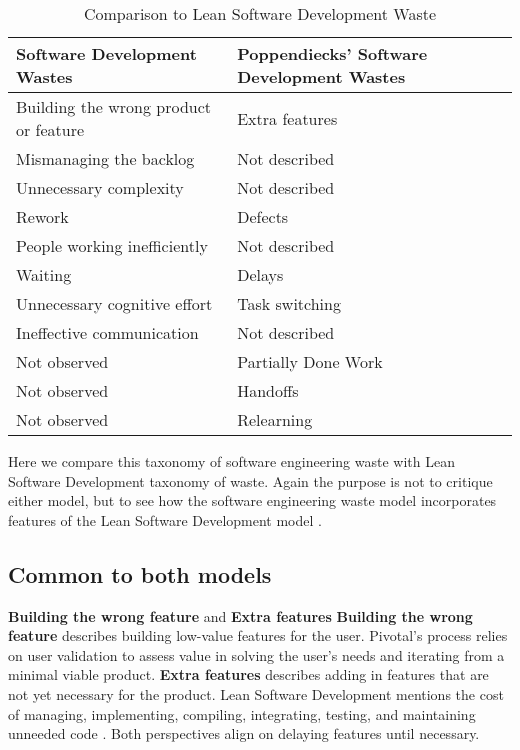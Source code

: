 \begin{table}[t]
\renewcommand{\arraystretch}{1.5}
\centering
\caption{Comparison to Lean Software Development Waste}
\label{LeanSoftwareDevelopmentComparison}
\begin{tabular}{|p{1.57in}|p{1.57in}|}
\hline
Software Development Wastes           & Poppendiecks' Software Development Wastes \\ \hline
Building the wrong product or feature & Extra features                            \\ \hline
Mismanaging the backlog               & Not described                             \\ \hline
Unnecessary complexity                & Not described                             \\ \hline
Rework                                & Defects                                   \\ \hline
People working inefficiently          & Not described                             \\ \hline
Waiting                               & Delays                                    \\ \hline
Unnecessary cognitive effort          & Task switching                            \\ \hline
Ineffective communication             & Not described                             \\ \hline
Not observed                          & Partially Done Work                       \\ \hline
Not observed                          & Handoffs                                  \\ \hline
Not observed                          & Relearning                                \\ \hline
\end{tabular}
\end{table}
Here we compare this taxonomy of software engineering waste with Lean Software Development taxonomy of waste. Again the purpose is not to critique either model, but to see how the software engineering waste model incorporates features of the Lean Software Development model \cite{PoppendieckConceptToCash}. 

\subsection{Common to both models}
\textbf{Building the wrong feature} and \textbf{Extra features}
\textbf{Building the wrong feature} describes building low-value features for the user. Pivotal's process relies on user validation to assess value in solving the user's needs and iterating from a minimal viable product. \textbf{Extra features} describes adding in features that are not yet necessary for the product. Lean Software Development mentions the cost of managing, implementing, compiling, integrating, testing, and maintaining unneeded code \cite{PoppendieckLeanSoftwareDevelopment}.  Both perspectives align on delaying features until necessary. 

